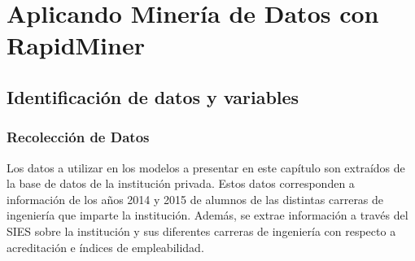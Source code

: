 \chapter[Aplicando Minería de Datos con RapidMiner]{Aplicando Minería de Datos con RapidMiner}
\label{ch:desmin}

\section{Identificación de datos y variables}
\subsection{Recolección de Datos}

Los datos a utilizar en los modelos a presentar en este capítulo son extraídos de la base de datos de la institución privada. Estos datos corresponden a información de los años 2014 y 2015 de alumnos de las distintas carreras de ingeniería que imparte la institución. Además, se extrae información a través del SIES sobre la institución y sus diferentes carreras de ingeniería con respecto a acreditación e índices de empleabilidad.\\

